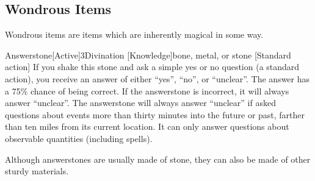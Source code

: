     \subsection{Wondrous Items}

        Wondrous items are items which are inherently magical in some way.

        \begin{magicitemdef}{Answerstone}[Active]{3}{Divination [Knowledge]}{bone, metal, or stone}
            [Standard action] If you shake this stone and ask a simple yes or no question (a standard action), you receive an answer of either ``yes'', ``no'', or ``unclear''.
            The answer has a 75\% chance of being correct.
            If the answerstone is incorrect, it will always answer ``unclear''.
            The answerstone will always answer ``unclear'' if asked questions about events more than thirty minutes into the future or past, farther than ten miles from its current location.
            It can only answer questions about observable quantities (including spells).

            Although answerstones are usually made of stone, they can also be made of other sturdy materials.
        \end{magicitemdef}

